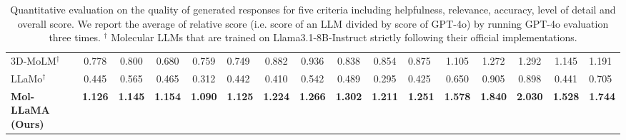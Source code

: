 \begin{table*}[htbp]
{\begin{tabular}{l c c c c a c c c c a c c c c a}
    3D-MoLM$^\dagger$ & 0.778 & 0.800 & 0.680 & 0.759 & 0.749 & 0.882 & 0.936 & 0.838 & 0.854 & 0.875 & 1.105 & 1.272 & 1.292 & 1.145 & 1.191 \\
    LLaMo$^\dagger$ & 0.445 & 0.565 & 0.465 & 0.312 & 0.442 & 0.410 & 0.542 & 0.489 & 0.295 & 0.425 & 0.650 & 0.905 & 0.898 & 0.441 & 0.705 \\
    \textbf{Mol-LLaMA (Ours)} & \textbf{1.126} & \textbf{1.145} & \textbf{1.154} & \textbf{1.090} & \textbf{1.125} & \textbf{1.224} & \textbf{1.266} & \textbf{1.302} & \textbf{1.211} & \textbf{1.251} & \textbf{1.578} & \textbf{1.840} & \textbf{2.030} & \textbf{1.528} & \textbf{1.744} \\
    
    \bottomrule
    \end{tabular}}
    \hfill
    \vspace{-0.1in}
    \caption{\small Quantitative evaluation on the quality of generated responses for five criteria including helpfulness, relevance, accuracy, level of detail and overall score. We report the average of relative score (i.e. score of an LLM divided by score of GPT-4o) by running GPT-4o evaluation three times. $^\dagger$ Molecular LLMs that are trained on Llama3.1-8B-Instruct strictly following their official implementations.}
    \vspace{-0.05in}
    \label{tab:general_quantitative}
\end{table*}